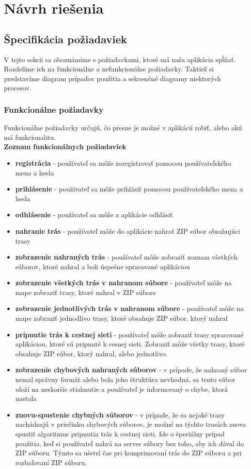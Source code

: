 \section{Návrh riešenia}
\subsection{Špecifikácia požiadaviek}
\indent \indent V tejto sekcii sa oboznámime s požiadavkami, ktoré má naša aplikácia spĺňať. Rozdelíme ich na funkcionálne a nefunkcionálne požiadavky. Taktiež si predstavíme diagram prípadov použitia a sekvenčné diagramy niektorých procesov.
\subsubsection{Funkcionálne požiadavky}
\indent \indent Funkcionálne požiadavky určujú, čo presne je možné v aplikácii robiť, alebo akú má funkcionalitu.\\
\textbf{Zoznam funkcionálnych požiadaviek}
\begin{itemize}
    \item \textbf{registrácia} - používateľ sa môže zaregistrovať pomocou používateľského mena a hesla
    \item \textbf{prihlásenie} - používateľ sa môže prihlásiť pomocou používateľského mena a hesla
    \item \textbf{odhlásenie} - používateľ sa môže z aplikácie odhlásiť
    \item \textbf{nahranie trás} - používateľ môže do aplikácie nahrať ZIP súbor obsahujúci trasy
    \item \textbf{zobrazenie nahraných trás} - používateľ môže zobraziť zoznam všetkých súborov, ktoré nahral a boli úspešne spracované aplikáciou
    \item \textbf{zobrazenie všetkých trás v nahranom súbore} - používateľ môže na mape zobraziť trasy, ktoré nahral v ZIP súbore
    \item \textbf{zobrazenie jednotlivých trás v nahranom súbore} - používateľ môže na mape zobraziť jednodlivo trasy, ktoré obsahuje ZIP súbor, ktorý nahral
    \item \textbf{pripnutie trás k cestnej sieti} - používateľ môže zobraziť trasy spracované aplikáciou, ktoré sú pripnuté k cesnej sieti. Zobraziť môže všetky trasy, ktoré obsahuje ZIP súbor, ktorý nahral, alebo jednotlivo.
    \item \textbf{zobrazenie chybových nahraných súborov} - v prípade, že nahraný súbor nemal správny formát alebo bola jeho štruktúra nevhodná, sa tento súbor uloží na neskoršie stiahnutie a používateľ je informovaný o chybe, ktorá nastala
    \item \textbf{znovu-spustenie chybných súborov} - v prípade, že sa nejaké trasy nachádzajú v priečinku chybových súborov, je možné na týchto trasách znova spustiť algoritmus pripnutia trás k cestnej sieti. Ide o špeciálny prípad použitia, keď si používateľ nahrá na server súbory bez toho, aby ich dával do ZIP súboru. Týmto sa ušetrí čas pri komprimovaní trás do ZIP súboru a pri rozbaľovaní ZIP súboru.
\end{itemize}
